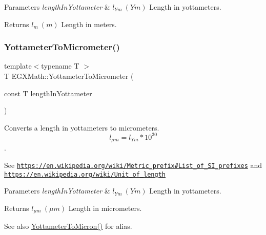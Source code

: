 \begin{DoxyParams}{Parameters}
{\em length\+In\+Yottameter} & $ l_{Ym}\ (Ym)$ Length in yottameters. \\
\hline
\end{DoxyParams}
\begin{DoxyReturn}{Returns}
$ l_{m}\ (m)$ Length in meters. 
\end{DoxyReturn}
\mbox{\label{group___e_g_x_math-_conversions-_length_conversions-_yottameter-_s_i_ga25310d8ba2830f305680927ac3c13c38}} 
\subsubsection{\texorpdfstring{Yottameter\+To\+Micrometer()}{YottameterToMicrometer()}}
{\footnotesize\ttfamily template$<$typename T $>$ \\
T E\+G\+X\+Math\+::\+Yottameter\+To\+Micrometer (\begin{DoxyParamCaption}\item[{const T}]{length\+In\+Yottameter }\end{DoxyParamCaption})}



Converts a length in yottameters to micrometers. \[ l_{\mu m}=l_{Ym} * 10^{30} \]. 

See \href{https://en.wikipedia.org/wiki/Metric_prefix#List_of_SI_prefixes}{\tt https\+://en.\+wikipedia.\+org/wiki/\+Metric\+\_\+prefix\#\+List\+\_\+of\+\_\+\+S\+I\+\_\+prefixes} and \href{https://en.wikipedia.org/wiki/Unit_of_length}{\tt https\+://en.\+wikipedia.\+org/wiki/\+Unit\+\_\+of\+\_\+length} 
\begin{DoxyParams}{Parameters}
{\em length\+In\+Yottameter} & $ l_{Ym}\ (Ym)$ Length in yottameters. \\
\hline
\end{DoxyParams}
\begin{DoxyReturn}{Returns}
$ l_{\mu m}\ (\mu m)$ Length in micrometers. 
\end{DoxyReturn}
\begin{DoxySeeAlso}{See also}
\mbox{\hyperlink{group___e_g_x_math-_conversions-_length_conversions-_yottameter-_non-_s_i_gaad96d515763b1dfbcd968020e1b97de4}{Yottameter\+To\+Micron()}} for alias. 
\end{DoxySeeAlso}
\mbox{\label{group___e_g_x_math-_conversions-_length_conversions-_yottameter-_s_i_ga0e68b787003f09883a6b15b92b003a07}} 
